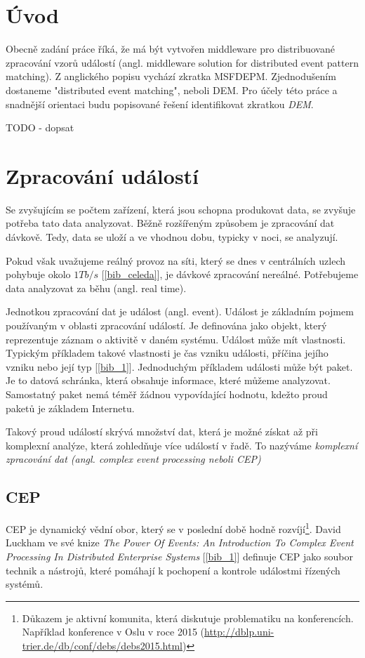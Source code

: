 \documentclass[
  digital, %
  table,   %
  nolof,     %
  nolot,     %
  oneside, %
  nocover,
  monochrome,
  12pt
]{fithesis3}
\begin{document}
\chapter{Úvod}

Obecně zadání práce říká, že má být vytvořen middleware pro distribuované zpracování vzorů událostí (angl. middleware solution for distributed event pattern matching). Z anglického popisu vychází zkratka MSFDEPM. Zjednodušením dostaneme "distributed event matching", neboli DEM. Pro účely této práce a snadnější orientaci budu popisované řešení identifikovat zkratkou \textit{DEM}.

TODO - dopsat

\chapter{Zpracování událostí}
Se zvyšujícím se počtem zařízení, která jsou schopna produkovat data, se zvyšuje potřeba tato data analyzovat. Běžně rozšířeným způsobem je zpracování dat dávkově. Tedy, data se uloží a ve vhodnou dobu, typicky v noci, se analyzují.

Pokud však uvažujeme reálný provoz na síti, který se dnes v centrálních uzlech pohybuje okolo $1 Tb/s$
[\ref{bib_celeda}], je dávkové zpracování nereálné. Potřebujeme data analyzovat za běhu (angl. real time).

Jednotkou zpracování dat je událost (angl. event). Událost je základním pojmem používaným v oblasti zpracování událostí. Je definována jako objekt, který reprezentuje záznam o aktivitě v daném systému. Událost může mít vlastnosti. Typickým příkladem takové vlastnosti je čas vzniku události, příčina jejího vzniku nebo její typ [\ref{bib_1}]. Jednoduchým příkladem události může být paket. Je to datová schránka, která obsahuje informace, které můžeme analyzovat. Samostatný paket nemá téměř žádnou vypovídající hodnotu, kdežto proud paketů je základem Internetu.

Takový proud událostí skrývá množství dat, která je možné získat až při komplexní analýze, která zohledňuje více událostí v řadě. To nazýváme \textit{komplexní zpracování dat (angl. complex event processing neboli CEP)}


\section{CEP}

CEP je dynamický vědní obor, který se v poslední době hodně rozvíjí\footnote{Důkazem je aktivní komunita, která diskutuje problematiku na konferencích. Například konference v Oslu v roce 2015 (\url{http://dblp.uni-trier.de/db/conf/debs/debs2015.html})}. David Luckham ve své knize \textit{The Power Of Events: An Introduction To Complex Event Processing In Distributed Enterprise Systems} [\ref{bib_1}] definuje CEP jako soubor technik a nástrojů, které pomáhají k pochopení a kontrole událostmi řízených systémů.
\end{document}
